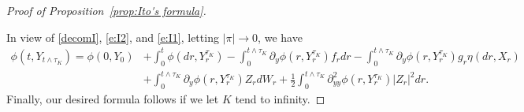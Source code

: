 \documentclass[10pt,a4paper]{amsart}
\begin{document}
\begin{proof}[Proof of Proposition~\ref{prop:Ito's formula}]
\ \ \ \ \

In view of \eqref{decomI}, \eqref{e:I2}, and \eqref{e:I1}, letting $|\pi|\rightarrow 0$, we have
\begin{equation*}
\begin{aligned}
\phi(t,Y_{t\land \tau_{K}}) =   \phi(0,Y_{0}) &+ \int_{0}^{t}  \phi(dr,Y^{\tau_{K}}_{r}) -\int_{0}^{t\land\tau_{K}}\partial_{y}  \phi(r,Y^{\tau_{K}}_{r}) f_{r} dr - \int_{0}^{t\land\tau_{K}} \partial_{y}  \phi(r,Y^{\tau_{K}}_{r})g_{r}\eta(dr,X_{r})\\
&+ \int_{0}^{t\land\tau_{K}}  \partial_{y} \phi(r,Y^{\tau_{K}}_{r})Z_{r} dW_{r} + \frac{1}{2}\int_{0}^{t\land\tau_{K}}\partial^{2}_{yy}  \phi(r,Y^{\tau_{K}}_{r})|Z_{r}|^{2} dr.
\end{aligned}
\end{equation*}
Finally, our desired formula follows if we let $K$ tend to infinity. 
\end{proof}
\end{document}
